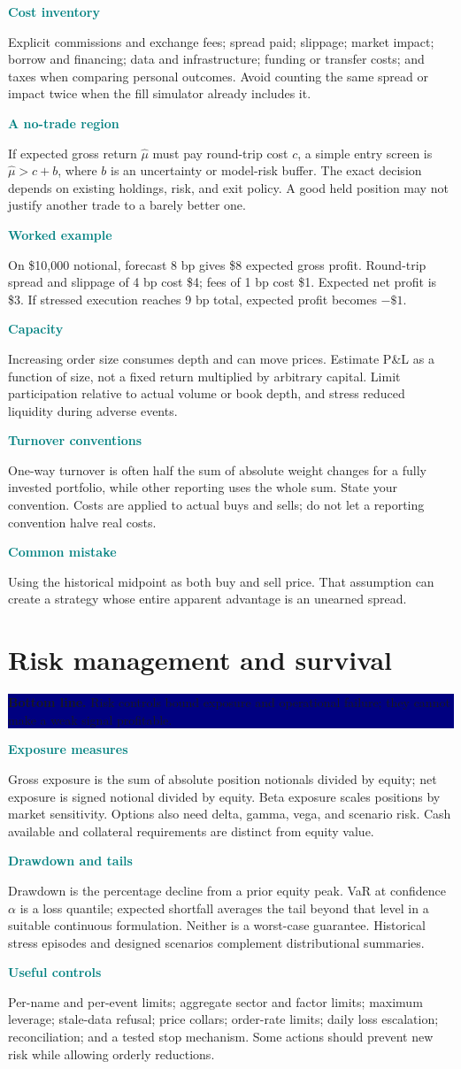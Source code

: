 \documentclass[10pt,letterpaper]{article}
\newcommand{\bl}[1]{\noindent\colorbox{navy}{\parbox{\dimexpr\linewidth-2\fboxsep}{\color{white}\textbf{Bottom line.} #1}}\par\medskip}
\newcommand{\topic}[2]{\clearpage\section{#1}\bl{#2}}
\newcommand{\sub}[1]{\par\textbf{\textcolor{teal}{#1}}\par}
\newcommand{\ex}[1]{\sub{Worked example}#1}
\newcommand{\pit}[1]{\sub{Common mistake}#1}
\begin{document}
\sub{Cost inventory}
Explicit commissions and exchange fees; spread paid; slippage; market impact; borrow and financing; data and infrastructure; funding or transfer costs; and taxes when comparing personal outcomes. Avoid counting the same spread or impact twice when the fill simulator already includes it.
\sub{A no-trade region}
If expected gross return $\hat\mu$ must pay round-trip cost $c$, a simple entry screen is $\hat\mu>c+b$, where $b$ is an uncertainty or model-risk buffer. The exact decision depends on existing holdings, risk, and exit policy. A good held position may not justify another trade to a barely better one.
\ex{On \$10,000 notional, forecast 8 bp gives \$8 expected gross profit. Round-trip spread and slippage of 4 bp cost \$4; fees of 1 bp cost \$1. Expected net profit is \$3. If stressed execution reaches 9 bp total, expected profit becomes $-\$1$.}
\sub{Capacity}
Increasing order size consumes depth and can move prices. Estimate P\&L as a function of size, not a fixed return multiplied by arbitrary capital. Limit participation relative to actual volume or book depth, and stress reduced liquidity during adverse events.
\sub{Turnover conventions}
One-way turnover is often half the sum of absolute weight changes for a fully invested portfolio, while other reporting uses the whole sum. State your convention. Costs are applied to actual buys and sells; do not let a reporting convention halve real costs.
\pit{Using the historical midpoint as both buy and sell price. That assumption can create a strategy whose entire apparent advantage is an unearned spread.}
\topic{Risk management and survival}{Risk controls bound exposure and operational failure; they cannot make a weak signal profitable.}
\sub{Exposure measures}
Gross exposure is the sum of absolute position notionals divided by equity; net exposure is signed notional divided by equity. Beta exposure scales positions by market sensitivity. Options also need delta, gamma, vega, and scenario risk. Cash available and collateral requirements are distinct from equity value.
\sub{Drawdown and tails}
Drawdown is the percentage decline from a prior equity peak. VaR at confidence $\alpha$ is a loss quantile; expected shortfall averages the tail beyond that level in a suitable continuous formulation. Neither is a worst-case guarantee. Historical stress episodes and designed scenarios complement distributional summaries.
\sub{Useful controls}
Per-name and per-event limits; aggregate sector and factor limits; maximum leverage; stale-data refusal; price collars; order-rate limits; daily loss escalation; reconciliation; and a tested stop mechanism. Some actions should prevent new risk while allowing orderly reductions.
\end{document}

